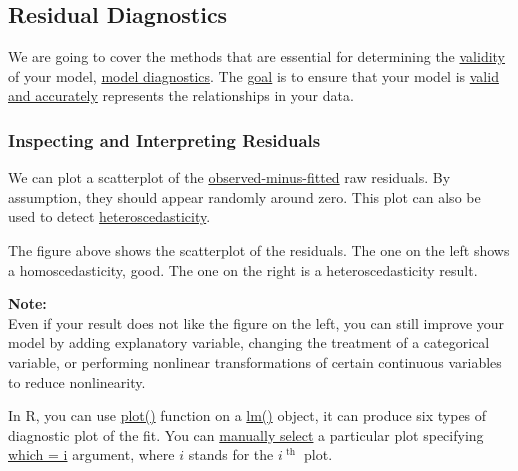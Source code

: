\documentclass[12pt]{article}
\begin{document}
\subsection{Residual Diagnostics}

We are going to cover the methods that are essential for determining
the {\underline {validity}} of your model, 
{\underline {model diagnostics}}.
The {\underline {goal}} is to ensure that your model is 
{\underline {valid and accurately}} represents the relationships in
your data.



\subsubsection{Inspecting and Interpreting Residuals}

We can plot a scatterplot of the {\underline {observed-minus-fitted}}
raw residuals. By assumption, they should appear randomly around zero.
This plot can also be used to detect {\underline {heteroscedasticity}}.

\begin{figure}[H]
\end{figure}

The figure above shows the scatterplot of the residuals. The one on 
the left shows a homoscedasticity, good. The one on the right
is a heteroscedasticity result.


{\textbf {Note:}}\\
Even if your result does not like the figure on the left, you can still
improve your model by adding explanatory variable, changing the
treatment of a categorical variable, or performing nonlinear
transformations of certain continuous variables to reduce 
nonlinearity.

In R, you can use {\underline {plot()}} function on a 
{\underline {lm()}} object, it can produce six types of diagnostic
plot of the fit. You can {\underline {manually select}} a particular
plot specifying {\underline {which = i}} argument, where $ i $ stands
for the $ i^{\text{ th }} $ plot.
\end{document}
